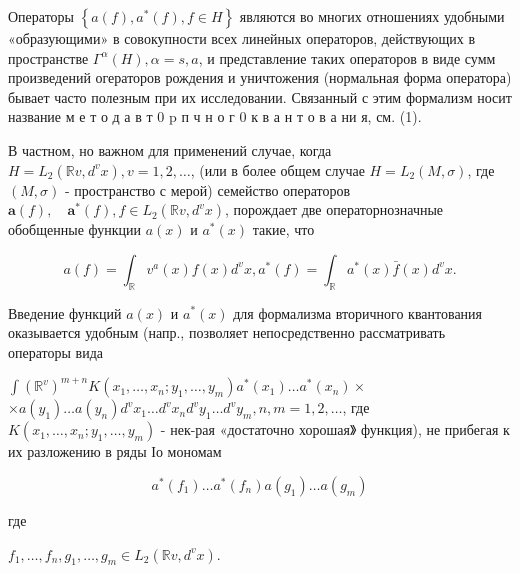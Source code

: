 \documentclass[10pt]{article}
\begin{document}
Операторы $\left\{a(f), a^{*}(f), f \in H\right\}$ являются во многих отношениях удобными «образующими» в совокупности всех линейных операторов, действующих в пространстве $\Gamma^{\alpha}(H), \alpha=s, a$, и представление таких операторов в виде сумм произведений огераторов рождения и уничтожения (нормальная форма оператора) бывает часто полезным при их исследовании. Связанный с этим формализм носит название м е т о д а в т 0 p п ч н о г 0 к в а н т о в а ни я, см. (1).



В частном, но важном для применений случае, когда $H=L_{2}\left(\mathbb{R} v, d^{v} x\right), v=1,2, \ldots$, (или в более общем случае $H=L_{2}(M, \sigma)$, где $(M, \sigma)$ - пространство с мерой) семейство операторов $\boldsymbol{a}(f), \quad \boldsymbol{a}^{*}(f), f \in L_{2}\left(\mathbb{R} v, d^{v} x\right)$, порождает две операторнозначные обобщенные функции $a(x)$ и $a^{*}(x)$ такие, что



\[

a(f)=\int_{\mathbb{R}} v^{a}(x) f(x) d^{v} x, a^{*}(f)=\int_{\mathbb{R}} a^{*}(x) \bar{f}(x) d^{v} x .

\]



Введение функций $a(x)$ и $a^{*}(x)$ для формализма вторичного квантования оказывается удобным (напр., позволяет непосредственно рассматривать операторы вида



$\int\left(\mathbb{R}^{v}\right)^{m+n} K\left(x_{1}, \ldots, x_{n} ; y_{1}, \ldots, y_{m}\right) a^{*}\left(x_{1}\right) \ldots a^{*}\left(x_{n}\right) \times$ $\times a\left(y_{1}\right) \ldots a\left(y_{n}\right) d^{v} x_{1} \ldots d^{v} x_{n} d^{v} y_{1} \ldots d^{v} y_{m}, n, m=1,2, \ldots$, где $K\left(x_{1}, \ldots, x_{n} ; y_{1}, \ldots, y_{m}\right)$ - нек-рая «достаточно хорошая》 функция), не прибегая к их разложению в ряды Іо мономам



\[

a^{*}\left(f_{1}\right) \ldots a^{*}\left(f_{n}\right) a\left(g_{1}\right) \ldots a\left(g_{m}\right)

\]



где



$f_{1}, \ldots, f_{n}, g_{1}, \ldots, g_{m} \in L_{2}\left(\mathbb{R} v, d^{v} x\right)$.
\end{document}
